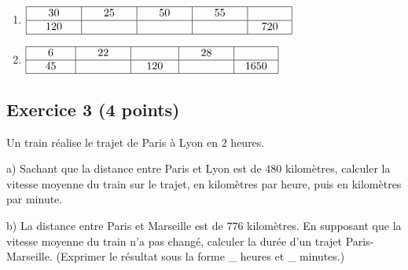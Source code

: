 \documentclass[14 pt]{extarticle}
\theoremstyle{plain}
\begin{document}
\begin{enumerate}
\item $\renewcommand{\arraystretch}{1}
\begin{array}{|c|c|c|c|c|}
\hline
\phantom{000}30 \phantom{000} & \phantom{000}25\phantom{000} & \phantom{000}50 \phantom{000}&  \phantom{000}55\phantom{000} & \phantom{000} \phantom{000} \\
\hline
120 & \phantom{700} &   & & 720 \\
\hline
\end{array}
\renewcommand{\arraystretch}{1}$

\item $\renewcommand{\arraystretch}{1}
\begin{array}{|c|c|c|c|c|}
\hline
\phantom{000}6\phantom{000} & \phantom{000}22\phantom{000} & \phantom{000} \ \phantom{000} & \phantom{000}28\phantom{000}& \phantom{000}\phantom{000}   \\
\hline
45 &   & 120& &1650\\
\hline
\end{array}
\renewcommand{\arraystretch}{1}$
\end{enumerate}

\subsection*{Exercice 3 (4 points)}

Un train réalise le trajet de Paris à Lyon en $2$ heures. 

a) Sachant que la distance entre Paris et Lyon est de $480$ 
kilomètres, calculer la vitesse moyenne du train sur le trajet, en kilomètres par heure, puis en kilomètres par minute. 

b) La distance entre Paris et Marseille est de $776$ kilomètres. En 
supposant que la vitesse moyenne du train n'a pas changé, calculer la durée d'un trajet Paris-Marseille. (Exprimer le résultat sous la forme \_ heures et \_ minutes.)

 
 


 	
\end{document}

